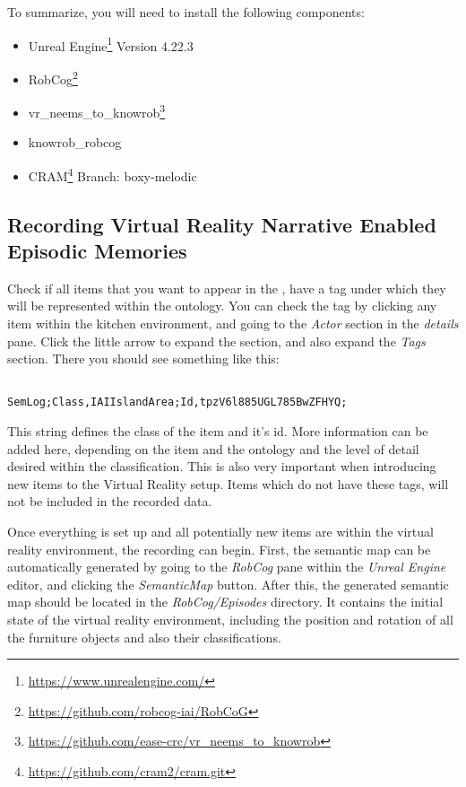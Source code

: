  
To summarize, you will need to install the following components: 
\begin{itemize}
	\item Unreal Engine\footnote{\url{https://www.unrealengine.com/}} Version 4.22.3
	\item RobCog\footnote{\url{https://github.com/robcog-iai/RobCoG}}
	\item vr\_neems\_to\_knowrob\footnote{\url{https://github.com/ease-crc/vr_neems_to_knowrob}} 
	\item knowrob\_robcog 
	\item CRAM\footnote{\url{https://github.com/cram2/cram.git}} Branch: boxy-melodic

\end{itemize}

\subsection{Recording Virtual Reality Narrative Enabled Episodic Memories}
Check if all items that you want to appear in the \neems, have a tag under which they will be represented within the ontology. You can check the tag by clicking any item within the kitchen environment, and going to the \textit{Actor} section in the \textit{details} pane. Click the little arrow to expand the section, and also expand the \textit{Tags} section. There you should see something like this:

\begin{lstlisting}

SemLog;Class,IAIIslandArea;Id,tpzV6l885UGL785BwZFHYQ;

\end{lstlisting}
This string defines the class of the item and it's id. More information can be added here, depending on the item and the ontology and the level of detail desired within the classification. This is also very important when introducing new items to the Virtual Reality setup. Items which do not have these tags, will not be included in the recorded \neem data. 

Once everything is set up and all potentially new items are within the virtual reality environment, the recording can begin. First, the semantic map can be automatically generated by going to the \textit{RobCog} pane within the \textit{Unreal Engine} editor, and clicking the \textit{SemanticMap} button. 
After this, the generated semantic map should be located in the \textit{RobCog/Episodes} directory. It contains the initial state of the virtual reality environment, including the position and rotation of all the furniture objects and also their classifications. 

